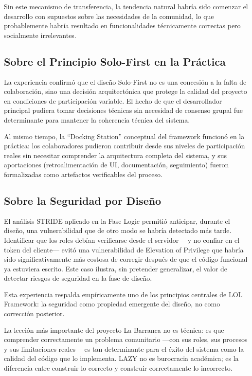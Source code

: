 \documentclass[14pt,a4paper,oneside]{extbook}
\begin{document}
Sin este mecanismo de transferencia, la tendencia natural habría sido comenzar el desarrollo con supuestos sobre las necesidades de la comunidad, lo que probablemente habría resultado en funcionalidades técnicamente correctas pero socialmente irrelevantes.

\subsection{Sobre el Principio Solo-First en la Práctica}

La experiencia confirmó que el diseño Solo-First no es una concesión a la falta de colaboración, sino una decisión arquitectónica que protege la calidad del proyecto en condiciones de participación variable. El hecho de que el desarrollador principal pudiera tomar decisiones técnicas sin necesidad de consenso grupal fue determinante para mantener la coherencia técnica del sistema.

Al mismo tiempo, la \enquote{Docking Station} conceptual del framework funcionó en la práctica: los colaboradores pudieron contribuir desde sus niveles de participación reales sin necesitar comprender la arquitectura completa del sistema, y sus aportaciones (retroalimentación de UI, documentación, seguimiento) fueron formalizadas como artefactos verificables del proceso.

\subsection{Sobre la Seguridad por Diseño}

El análisis STRIDE aplicado en la Fase Logic permitió anticipar, durante el diseño, una vulnerabilidad que de otro modo se habría detectado más tarde. Identificar que los roles debían verificarse desde el servidor ---y no confiar en el token del cliente--- evitó una vulnerabilidad de Elevation of Privilege que habría sido significativamente más costosa de corregir después de que el código funcional ya estuviera escrito. Este caso ilustra, sin pretender generalizar, el valor de detectar riesgos de seguridad en la fase de diseño.

Esta experiencia respalda empíricamente uno de los principios centrales de LOL Framework: la seguridad como propiedad emergente del diseño, no como corrección posterior.

\begin{authorobservation}
La lección más importante del proyecto La Barranca no es técnica: es que comprender correctamente un problema comunitario —con sus roles, sus procesos y sus limitaciones reales— es tan determinante para el éxito del sistema como la calidad del código que lo implementa. LAZY no es burocracia académica; es la diferencia entre construir lo correcto y construir correctamente lo incorrecto.
\end{authorobservation}
\end{document}
